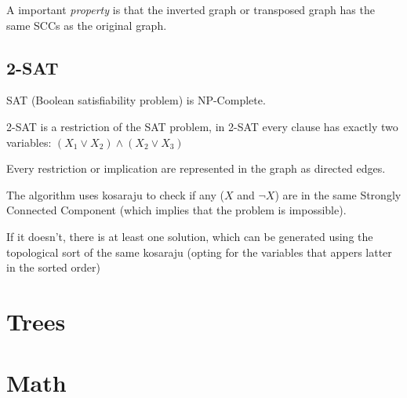 	A important \textit{property} is that the inverted graph or transposed graph has the same SCCs
	as the original graph.


	\subsection{2-SAT}
	
		SAT (Boolean satisfiability problem) is NP-Complete.

		2-SAT is a restriction of the SAT problem, in 2-SAT every clause has exactly two variables:
		$ (X_1 \vee X_2) \wedge (X_2 \vee X_3) $

		Every restriction or implication are represented in the graph as directed edges.

		The algorithm uses kosaraju to check if any ($X$ and $\neg{X}$) are in the same Strongly Connected Component 
		(which implies that the problem is impossible). 

		If it doesn't, there is at least one solution, which can be generated using the topological sort of the same kosaraju 
		(opting for the variables that appers latter in the sorted order)


\section{Trees}

\section{Math}
